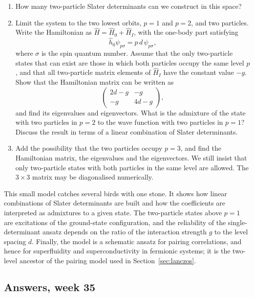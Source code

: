 \begin{enumerate}
  \item[a)] How many two-particle Slater determinants can we construct in this
  space?
  \item[b)] Limit the system to the two lowest orbits, $p=1$ and $p=2$, and
  two particles.  Write the Hamiltonian as
  $\hat{H}=\hat{H}_0+\hat{H}_I$, with the one-body part satisfying
  \[
    \hat{h}_0\psi_{p\sigma}=p\,d\,\psi_{p\sigma},
  \]
  where $\sigma$ is the spin quantum number.  Assume that the only
  two-particle states that can exist are those in which both particles occupy
  the same level $p$, and that all two-particle matrix elements of
  $\hat{H}_I$ have the constant value $-g$.  Show that the Hamiltonian matrix
  can be written as
  \[
    \begin{pmatrix} 2d-g & -g\\ -g & 4d-g\end{pmatrix},
  \]
  and find its eigenvalues and eigenvectors.  What is the admixture of the
  state with two particles in $p=2$ to the wave function with two particles in
  $p=1$?  Discuss the result in terms of a linear combination of Slater
  determinants.
  \item[c)] Add the possibility that the two particles occupy $p=3$, and find
  the Hamiltonian matrix, the eigenvalues and the eigenvectors.  We still
  insist that only two-particle states with both particles in the same level
  are allowed.  The $3\times3$ matrix may be diagonalised numerically.
\end{enumerate}

This small model catches several birds with one stone.  It shows how linear
combinations of Slater determinants are built and how the coefficients are
interpreted as admixtures to a given state.  The two-particle states above
$p=1$ are excitations of the ground-state configuration, and the reliability
of the single-determinant ansatz depends on the ratio of the interaction
strength $g$ to the level spacing $d$.  Finally, the model is a schematic
ansatz for pairing correlations, and hence for superfluidity and
superconductivity in fermionic systems; it is the two-level ancestor of the
pairing model used in Section~\ref{sec:lanczos}.

\subsection*{Answers, week 35}

